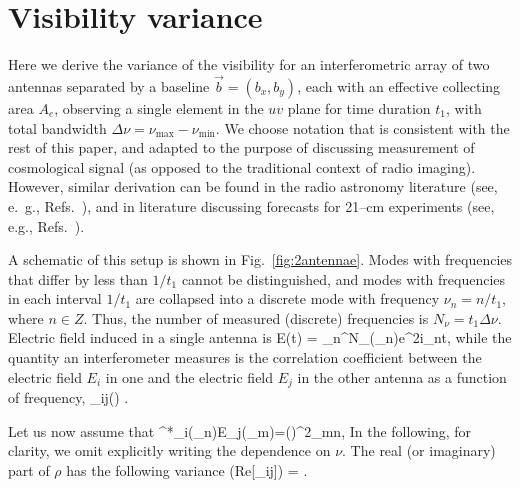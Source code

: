 \section{Visibility variance}
\label{app:Vrms}

Here we derive the variance of the visibility for an interferometric array of two antennas separated by a baseline $\vec{b}=(b_x,b_y)$, each with an effective collecting area $A_e$, observing a single element in the $uv$ plane for time duration $t_1$, with total bandwidth $\Delta \nu = \nu_\text{max}-\nu_\text{min}$. We choose notation that is consistent with the rest of this paper, and adapted to the purpose of discussing measurement of cosmological signal (as opposed to the traditional context of radio imaging). However, similar derivation can be found in the radio astronomy literature (see, e.~g., Refs.~\cite{2001isra.book.....T,1986sicn.book.....P}), and in literature discussing forecasts for 21--cm experiments (see, e.g., Refs.~\cite{2008PhRvD..78b3529M,2009astro2010S..82F,2014ApJ...782...66P,2007ApJ...661....1B,2008PhRvL.100i1302K,2008PhRvD..78b3529M}).

A schematic of this setup is shown in Fig.~\ref{fig:2antennae}. Modes with frequencies that differ by less than $1/t_1$ cannot be distinguished, and modes with frequencies in each interval $1/t_1$ are collapsed into a discrete mode with frequency $\nu_n = n/t_1$, where $n\in Z$. Thus, the number of measured (discrete) frequencies is $N_\nu=t_1\Delta \nu$. Electric field induced in a single antenna is
\beq
E(t) = \sum_{n}^{N_\nu}(\nu_n)e^{2\pi i\nu_nt},
\eeq
while the quantity an interferometer measures is the correlation coefficient between the electric field $E_i$ in one and the electric field $E_j$ in the other antenna as a function of frequency,
\beq
\rho_{ij}(\nu) \equiv {}.
\label{eq:rho_ij}
\eeq

Let us now assume that 
\beq
\bga
\langle {}^*_i(\nu_n)\widetilde E_j(\nu_m)\rangle=\sigma(\nu)^2\delta_{mn},
\ega
\label{eq:var_ReE}
\eeq
In the following, for clarity, we omit explicitly writing the dependence on $\nu$.  The real (or imaginary) part of $\rho$ has the following variance
\beq
\bga
{}(Re[\rho_{ij}]) 
 = .
\ega
\label{eq:var_Rerho}
\eeq

